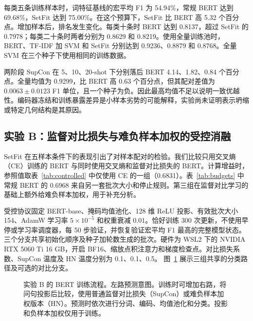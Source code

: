\documentclass[runningheads]{llncs}
\begin{document}
每类五条训练样本时，词特征基线的宏平均 F1 为 54.94\%，常规 BERT 达到 69.68\%，SetFit 达到 75.00\%。在这个预算下，SetFit 比 BERT 高 5.32 个百分点。增加样本后，排名发生变化。每类十条时 BERT 达到 0.8137，超过 SetFit 的 0.7978；每类二十条时两者分别为 0.8629 和 0.8219。使用全量训练池时，BERT、TF-IDF 加 SVM 和 SetFit 分别达到 0.9236、0.8879 和 0.8768。全量 SVM 在三个种子下使用相同的训练数据。

两阶段 SupCon 在 5、10、20-shot 下分别落后 BERT 4.14、1.82、0.84 个百分点。全量均值为 0.9299，比 BERT 高 0.63 个百分点，但其配对差值为 $0.0063\pm0.0123$ F1 单位，且一个种子为负。因此最高均值不足以说明一致优越性。编码器冻结和训练暴露差异是小样本劣势的可能解释，实验尚未证明表示坍缩或特定几何结构是其原因。

\subsection{实验 B：监督对比损失与难负样本加权的受控消融}
SetFit 在五样本条件下的表现引出了对样本配对的检验。我们比较只用交叉熵（CE）训练的 BERT 与同时使用交叉熵和监督对比损失的 BERT。计算增益时，参照值取表~\ref{tab:controlled} 中仅使用 CE 的一组（0.6831）。表~\ref{tab:budgets} 中常规 BERT 的 0.6968 来自另一套批次大小和停止规则。第三组在监督对比学习的基础上额外给难负样本加权，用于补充分析。

受控协议固定 BERT-base、掩码均值池化、128 维 ReLU 投影、有效批次大小 154、AdamW 学习率 $5\times10^{-5}$ 和权重衰减 0.01。恰好训练 300 次更新，不使用早停或学习率调度器，每 50 步验证，并恢复验证宏平均 F1 最高的完整模型状态。三个分支共享初始化顺序及种子加轮数生成的批次。硬件为 WSL2 下的 NVIDIA RTX 5060 Ti 16 GB，开启 BF16、缩放点积注意力和梯度检查点。对比损失系数、SupCon 温度及 HN 温度分别为 0.1、0.1、0.5。 图~\ref{fig:pipeline} 展示三组共享的分类路径及可选的对比分支。

\begin{figure}[hb]\centering

\caption{实验 B 的 BERT 训练流程。左路预测意图。训练时可增加右路，将问句投影后比较，使用普通监督对比损失（SupCon）或难负样本加权版本（HN）。预测时依次进行分词、编码、均值池化和分类。投影和负样本加权仅用于训练。}
\label{fig:pipeline}\end{figure}

\begin{table}[tb]\caption{5-shot 受控结果，三个种子。耗时包含训练及周期验证；吞吐为预热后的测试推理，含批次装载和分数回传，不含分词及模型加载。显存为 PyTorch 峰值已分配显存。}
\label{tab:controlled}\centering\end{table}
\end{document}

